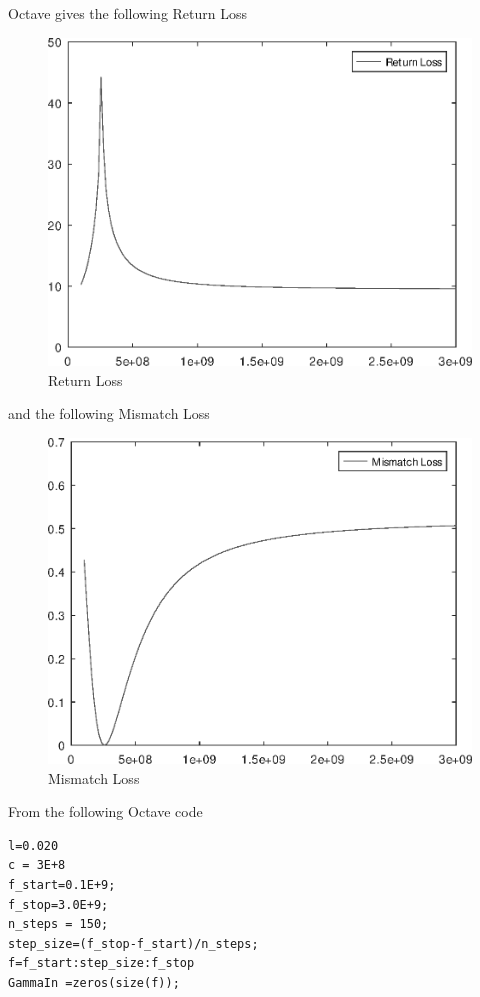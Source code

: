 \documentclass{article}
\begin{document}
\begin{multicols}{2}
\begin{enumerate}[label=(\alph*)]
Octave gives the following Return Loss
\begin{figure}[H]
  \includegraphics[width=\linewidth]{return_loss.eps}
  \caption{Return Loss}
  \label{fig4}
\end{figure}
and the following Mismatch Loss
\begin{figure}[H]
  \includegraphics[width=\linewidth]{mismatch_loss.eps}
  \caption{Mismatch Loss}
  \label{fig4}
\end{figure}
From the following Octave code
\begin{verbatim}
l=0.020
c = 3E+8
f_start=0.1E+9;
f_stop=3.0E+9;
n_steps = 150;
step_size=(f_stop-f_start)/n_steps;
f=f_start:step_size:f_stop
GammaIn =zeros(size(f));


\end{verbatim}
\end{enumerate}
\end{multicols}
\end{document}
